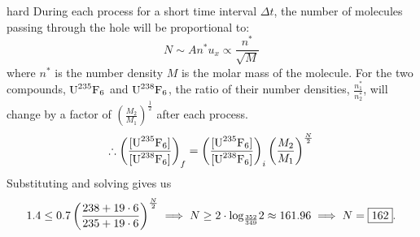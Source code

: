 \begin{solution}{hard}
During each process for a short time interval $\Delta t$, the number of molecules passing through the hole will be proportional to:
$$N\sim An^{*}u_x\propto \frac{n^*}{\sqrt M}$$
where $n^*$ is the number density $M$ is the molar mass of the molecule. For the two compounds, $\textup{U}^{\textup{235}}\textup{F}_6$ and $\textup{U}^{\textup{238}}\textup{F}_6$, the ratio of their number densities, $\frac{n^{*}_1}{n^{*}_2}$, will change by a factor of $\left(\frac{M_2}{M_1}\right)^{\frac{1}{2}}$ after each process.
$$\therefore \left (\frac{[\textup{U}^{\textup{235}}\textup{F}_6]}{[\textup{U}^{\textup{238}}\textup{F}_6]} \right )_{f}=\left (\frac{[\textup{U}^{\textup{235}}\textup{F}_6]}{[\textup{U}^{\textup{238}}\textup{F}_6]} \right )_{i}\left ( \frac{M_2}{M_1} \right )^{\frac{N}{2}}$$
Substituting and solving gives us 
$$1.4\leq 0.7\left ( \frac{238+19\cdot 6}{235+19\cdot 6} \right )^\frac{N}{2}
\implies N\geq 2\cdot \textup{log}_{\frac{352}{349}}2\approx161.96\implies N = \boxed{162}.$$
\end{solution}